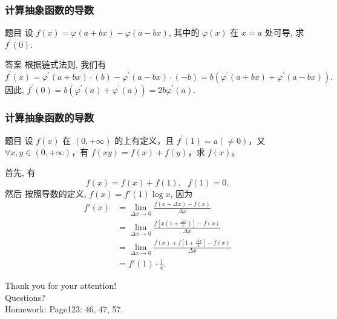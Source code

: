 \documentclass[
10pt,
aspectratio=43,
]{beamer}
\begin{document}
\begin{frame}
	\frametitle{计算抽象函数的导数}

	\begin{block}{题目}
		设 $f(x)=\varphi(a+b x)-\varphi(a-b x)$, 其中的 $\varphi(x)$ 在 $x=a$ 处可导, 求 $f^{\prime}(0)$.
	\end{block}

	\pause

	\begin{exampleblock}{答案}
		根据链式法则, 我们有
		\[
			f^{\prime}(x) = \varphi^{\prime}(a+b x) \cdot (b) - \varphi^{\prime}(a-b x) \cdot (-b) = b(\varphi^{\prime}(a+b x) + \varphi^{\prime}(a-b x)).
		\]
		因此, $f^{\prime}(0) = b(\varphi^{\prime}(a) + \varphi^{\prime}(a)) = 2b\varphi^{\prime}(a)$.
	\end{exampleblock}

\end{frame}

\begin{frame}
	\frametitle{计算抽象函数的导数}

	\begin{block}{题目}
		设 $f(x)$ 在 $(0,+\infty)$ 的上有定义，且 $f^{\prime}(1)=a(\neq 0)$，又 $\forall x, y \in(0,+\infty)$，有 $f(x y)=f(x)+f(y)$，求 $f(x)$。
	\end{block}

	\pause

	\begin{exampleblock}{}
		首先, 有 \[
			f(x)=f(x)+f(1),\,\,\,\, f(1)=0.
		\]
		然后 按照导数的定义, $f(x)=f'(1)\log x$, 因为
		\begin{align*}
			f'(x) & =\lim_{\Delta x\to0}\frac{f(x+\Delta x)-f(x)}{\Delta x}                                    \\
			      & =\lim_{\Delta x\to0}\frac{f\left[x\left(1+\frac{\Delta x}{x}\right)\right]-f(x)}{\Delta x} \\
			      & =\lim_{\Delta x\to0}\frac{f(x)+f\left[1+\frac{\Delta x}{x}\right]-f(x)}{\Delta x}          \\
			      & =f'(1)\cdot \frac{1}{x}.
		\end{align*}
	\end{exampleblock}
\end{frame}

\begin{frame}[plain]
	\vfill
	\centering
	{
	\centering \Huge \color{white} Thank you for your attention!\\[10pt]Questions?\\ [10pt] Homework: Page123: 46, 47, 57.
	}
	\vfill
\end{frame}
\end{document}
